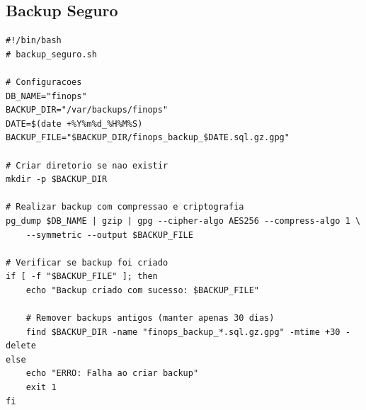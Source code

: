 \subsection{Backup Seguro}

\begin{lstlisting}[caption=Script de backup com criptografia]
#!/bin/bash
# backup_seguro.sh

# Configuracoes
DB_NAME="finops"
BACKUP_DIR="/var/backups/finops"
DATE=$(date +%Y%m%d_%H%M%S)
BACKUP_FILE="$BACKUP_DIR/finops_backup_$DATE.sql.gz.gpg"

# Criar diretorio se nao existir
mkdir -p $BACKUP_DIR

# Realizar backup com compressao e criptografia
pg_dump $DB_NAME | gzip | gpg --cipher-algo AES256 --compress-algo 1 \
    --symmetric --output $BACKUP_FILE

# Verificar se backup foi criado
if [ -f "$BACKUP_FILE" ]; then
    echo "Backup criado com sucesso: $BACKUP_FILE"
    
    # Remover backups antigos (manter apenas 30 dias)
    find $BACKUP_DIR -name "finops_backup_*.sql.gz.gpg" -mtime +30 -delete
else
    echo "ERRO: Falha ao criar backup"
    exit 1
fi
\end{lstlisting}
